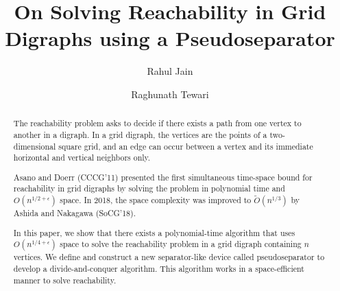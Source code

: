 \documentclass{toc}
\begin{document}
\begin{frontmatter}%

%
%
%

%
%

%
%

%
\title{On Solving Reachability in Grid Digraphs  %
using a Pseudoseparator}
%
%
%

%
%
%
%
%
%
%
%
%
%
%
%


%
%
%
%

%

%
%

\author[Jain]{Rahul Jain }
\author[Tewari]{Raghunath Tewari}


%
%
%
%

%
%
%
%
%
%
%
%
\begin{abstract}
The reachability problem %
asks to decide %
if there exists a path from one vertex to another in a digraph. 
In a grid digraph, the vertices are
the %
%
points of a two-dimensional square grid,  %
and an edge can occur between a vertex and its 
immediate horizontal %
and vertical neighbors only.

Asano and Doerr (CCCG'11) presented the first simultaneous time-space
bound for reachability in grid 
%
digraphs %
%
%
%
%
%
by
%
solving
the problem in polynomial time and $O(n^{1/2 + \epsilon})$ space. In 2018, the space complexity was improved to $\tilde{O}(n^{1/3})$ by Ashida and Nakagawa (SoCG'18).

In this paper, we show that there exists a polynomial-time algorithm that uses $O(n^{1/4 + \epsilon})$ space to solve the reachability problem in a grid 
%
digraph %
containing $n$ vertices. We define and construct a new separator-like device called pseudoseparator to develop a divide-and-conquer algorithm. This algorithm works in a space-efficient manner to solve reachability.
\end{abstract}

%

\end{frontmatter}

%
%
%
\end{document}
